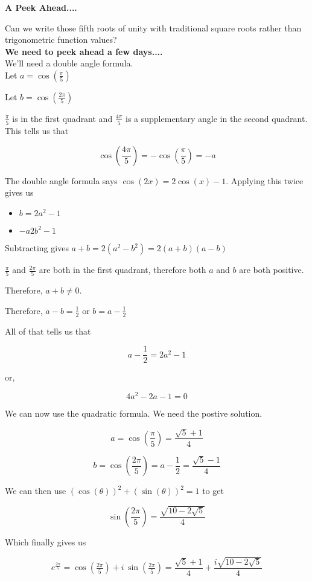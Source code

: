 \documentclass{ximera}
\begin{document}
\begin{claim} \textbf{\textcolor{purple!85!blue}{A Peek Ahead....}}

Can we write those fifth roots of unity with traditional square roots rather than trigonometric function values? \\


\textbf{\textcolor{purple!85!blue}{We need to peek ahead a few days....}} \\

We'll need a double angle formula. \\


Let $a = \cos\left(\frac{\pi}{5}\right)$


Let $b = \cos\left(\frac{2\pi}{5}\right)$



$\frac{\pi}{5}$ is in the first quadrant and $\frac{4\pi}{5}$ is a supplementary angle in the second quadrant.  This tells us that


\[  \cos\left(\frac{4\pi}{5}\right) = -\cos\left(\frac{\pi}{5}\right) = -a  \]


The double angle formula says $\cos(2x) = 2\cos(x) - 1$.  Applying this twice gives us


\begin{itemize}
\item $b = 2a^2 - 1$ 
\item $-a 2b^2 - 1$
\end{itemize}


Subtracting gives   $a + b = 2 (a^2 - b^2) = 2 (a+b)(a-b)$


$\frac{\pi}{5}$ and $\frac{2\pi}{5}$ are both in the first quadrant, therefore both $a$ and $b$ are both positive.


Therefore, $a+b \ne 0$.

Therefore, $a - b = \frac{1}{2}$ or $b = a - \frac{1}{2}$


All of that tells us that 

\[       a - \frac{1}{2} = 2a^2 - 1      \]


or,


\[             4a^2 - 2 a - 1 =0\]




We can now use the quadratic formula.  We need the postive solution.



\[  a =   \cos\left(\frac{\pi}{5}\right) =  \frac{\sqrt{5} + 1}{4}   \]


\[  b =   \cos\left(\frac{2\pi}{5}\right) = a - \frac{1}{2} =  \frac{\sqrt{5} - 1}{4}   \]



We can then use $(\cos(\theta))^2 +  (\sin(\theta))^2 = 1$ to get 


\[   \sin\left(\frac{2\pi}{5}\right)  =  \frac{\sqrt{10 - 2 \sqrt{5}}}{4}  \]




Which finally gives us



\[   e^{\tfrac{2\pi}{5}} = \cos(\tfrac{2\pi}{5}) + i \, \sin(\tfrac{2\pi}{5}) =  \frac{\sqrt{5} + 1}{4} +   \frac{i \sqrt{10 - 2 \sqrt{5}}}{4}     \]

\end{claim}
\end{document}
